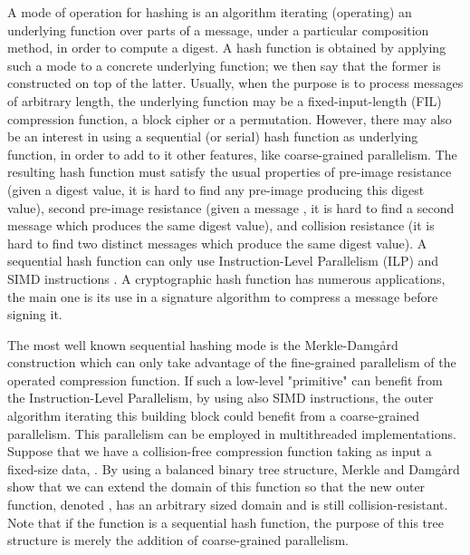 \documentclass{llncs}
\begin{document}
A mode of operation for hashing is an algorithm iterating (operating)
an underlying function over parts of a message, under a particular composition method, 
in order to compute a digest. 
A hash function is obtained by applying such a mode to a concrete underlying function;
we then
say that the former is constructed on top of the latter.
Usually, when the purpose is to process messages of arbitrary length, the underlying function may be a fixed-input-length (FIL) compression function, 
a block cipher or a permutation. 
However, there may also be an interest in using a sequential (or serial) hash function as underlying function, in order to add to it other features, 
like coarse-grained parallelism.
The resulting hash function must satisfy the usual properties of pre-image resistance (given a digest value, it is hard to find 
any pre-image producing this digest value),
second pre-image resistance (given a message , it is hard to find a second message  which produces the same digest value),
and collision resistance (it is hard to find two distinct messages which produce the same digest value).
A sequential hash function can only use 
Instruction-Level Parallelism (ILP) and SIMD instructions \cite{GK12a,GK12b}.
A cryptographic hash function has numerous applications, the 
main one is
its use
in a signature algorithm to compress a message before signing it.

The most well known sequential hashing mode is the Merkle-Damgård \cite{Dam90,Mer79} construction
which can only take advantage of the fine-grained parallelism of the operated compression function.
If such a low-level "primitive" can benefit from the Instruction-Level Parallelism, by using also
SIMD instructions, the outer algorithm iterating this building block could benefit from a coarse-grained 
parallelism. This parallelism can be employed in multithreaded implementations.
Suppose that we have a collision-free compression function taking as input
a fixed-size data, . By using a balanced binary tree structure, 
Merkle and Damgård \cite{Dam90,Mer80} show that we can extend the domain 
of this function so that the new outer function, denoted
, has an arbitrary sized domain and is still collision-resistant.
Note that if the function  is a sequential hash function, the purpose of this tree structure is merely the addition 
of coarse-grained parallelism.
\end{document}
